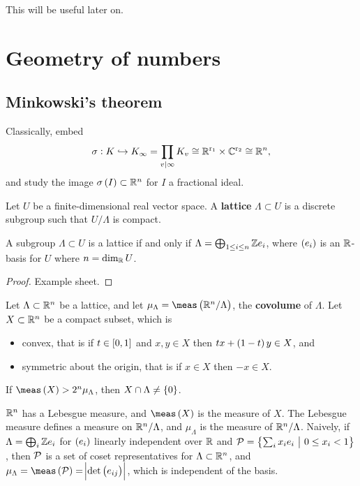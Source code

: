 This will be useful later on.

\pagebreak

\section{Geometry of numbers}

\subsection{Minkowski's theorem}

Classically, embed
$$ \sigma : K \hookrightarrow K_\infty = \prod_{v \mid \infty} K_v \cong \mathbb{R}^{\mathrm{r}_1} \times \mathbb{C}^{\mathrm{r}_2} \cong \mathbb{R}^n, $$
and study the image $ \sigma\br{I} \subset \RR^n $ for $ I $ a fractional ideal.

\begin{definition*}
Let $ U $ be a finite-dimensional real vector space. A \textbf{lattice} $ \Lambda \subset U $ is a discrete subgroup such that $ U / \Lambda $ is compact.
\end{definition*}

\begin{proposition}
A subgroup $ \Lambda \subset U $ is a lattice if and only if $ \Lambda = \bigoplus_{1 \le i \le n} \mathbb{Z} e_i $, where $ \br{e_i} $ is an $ \mathbb{R} $-basis for $ U $ where $ n = \dim_{\mathbb{R}} U $.
\end{proposition}

\begin{proof}
Example sheet.
\end{proof}

\begin{theorem}
\label{thm:7.2}
Let $ \Lambda \subset \mathbb{R}^n $ be a lattice, and let $ \mu_\Lambda = \meas\br{\RR^n / \Lambda} $, the \textbf{covolume} of $ \Lambda $. Let $ X \subset \mathbb{R}^n $ be a compact subset, which is
\begin{itemize}
\item convex, that is if $ t \in \sbr{0, 1} $ and $ x, y \in X $ then $ tx + \br{1 - t}y \in X $, and
\item symmetric about the origin, that is if $ x \in X $ then $ -x \in X $.
\end{itemize}
If $ \meas\br{X} > 2^n\mu_\Lambda $, then $ X \cap \Lambda \ne \cbr{0} $.
\end{theorem}

\begin{remark*}
$ \mathbb{R}^n $ has a Lebesgue measure, and $ \meas\br{X} $ is the measure of $ X $. The Lebesgue measure defines a measure on $ \mathbb{R}^n / \Lambda $, and $ \mu_\Lambda $ is the measure of $ \mathbb{R}^n / \Lambda $. Naively, if $ \Lambda = \bigoplus_i \mathbb{Z} e_i $ for $ \br{e_i} $ linearly independent over $ \mathbb{R} $ and $ \PPP = \cbr{\sum_i x_ie_i \st 0 \le x_i < 1} $, then $ \mathcal{P} $ is a set of coset representatives for $ \Lambda \subset \mathbb{R}^n $, and $ \mu_\Lambda = \meas\br{\PPP} = \abs{\det \br{e_{ij}}} $, which is independent of the basis.
\end{remark*}

